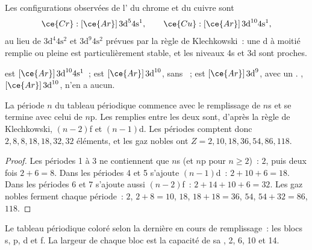 \begin{proposition}\label{prop:b1:quantum-numbers:exceptions}
Les configurations observées de l' du chrome et du cuivre sont
\[
  \ce{Cr}: [\ce{Ar}]\,3\text{d}^5 4\text{s}^1, \qquad
  \ce{Cu}: [\ce{Ar}]\,3\text{d}^{10} 4\text{s}^1 ,
\]
au lieu de $3\text{d}^4 4\text{s}^2$ et $3\text{d}^9 4\text{s}^2$
prévues par la règle de Klechkowski~: une  d à moitié remplie
ou pleine est particulièrement stable, et les niveaux 4s et 3d sont
proches.
\end{proposition}

\begin{example}\label{ex:b1:quantum-numbers:copper}
 est $[\ce{Ar}]\,3\text{d}^{10} 4\text{s}^1$~;  est
$[\ce{Ar}]\,3\text{d}^{10}$, sans ~; 
est $[\ce{Ar}]\,3\text{d}^9$, avec un . ,
$[\ce{Ar}]\,3\text{d}^{10}$, n'en a aucun.
\end{example}

\begin{proposition}\label{prop:b1:quantum-numbers:table}
La période $n$ du tableau périodique commence avec le remplissage de
$n$s et se termine avec celui de $n$p. Les  remplies entre
les deux sont, d'après la règle de Klechkowski, $(n-2)$f et $(n-1)$d.
Les périodes comptent donc $2, 8, 8, 18, 18, 32, 32$ éléments, et les
gaz nobles ont $Z = 2, 10,
18, 36, 54, 86, 118$.
\end{proposition}

\begin{proof}
Les périodes 1 à 3 ne contiennent que $n$s (et $n$p pour $n \ge 2$)~:
$2$, puis deux fois $2 + 6 = 8$. Dans les périodes 4 et 5 s'ajoute
$(n-1)$d~: $2 + 10 + 6 =
18$. Dans les périodes 6 et 7 s'ajoute aussi $(n-2)$f~:
$2 + 14 + 10 + 6 = 32$. Les gaz nobles ferment chaque période~: $2$, $2 + 8 = 10$,
$18$, $18 + 18 = 36$, $54$, $54 + 32 = 86$, $118$.
\end{proof}

\begin{omfigure}
\omperiodictable[colour=blocks, legend]

{\small Le tableau périodique coloré selon la dernière  en
cours de remplissage~: les blocs s, p, d et f. La largeur de chaque bloc
est la capacité de sa , 2, 6, 10 et 14.}
\end{omfigure}

